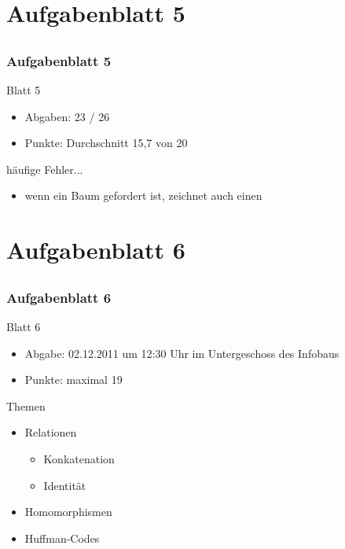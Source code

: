 
\section[Blatt 5]{Aufgabenblatt 5}
\subsection*{}
\begin{frame}
	\frametitle{Aufgabenblatt 5}
	\begin{block}{Blatt 5}
		\begin{itemize}
			\item Abgaben: 23 / 26
			\item Punkte: Durchschnitt 15,7 von 20
		\end{itemize}
  \end{block}
  
	\begin{block}{häufige Fehler...}
		\begin{itemize}
			\item[5.3:] wenn ein Baum gefordert ist, zeichnet auch einen
		 \end{itemize}
	\end{block}
\end{frame}

\section[Blatt 6]{Aufgabenblatt 6}
\subsection*{}
\begin{frame}
	\frametitle{Aufgabenblatt 6}
	\begin{block}{Blatt 6}
		\begin{itemize}
			\item Abgabe: 02.12.2011 um 12:30 Uhr im Untergeschoss des Infobaus
			\item Punkte: maximal 19
		\end{itemize}
  \end{block}
	\begin{block}{Themen}
		\begin{itemize}
	  		\item Relationen
		\begin{itemize}
	  		\item Konkatenation
	  		\item Identität
	  \end{itemize}
	  		\item Homomorphismen
	  		\item Huffman-Codes
	  \end{itemize}
	\end{block}
\end{frame}

